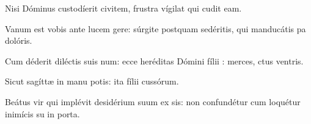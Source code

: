\item {}

\item Nisi Dóminus custodíerit civitem,\psstar{} frustra vígilat qui cudit eam.

\item Vanum est vobis ante lucem gere:\psstar{} súrgite postquam sedéritis, qui manducátis pa dolóris.

\item Cum déderit diléctis suis num:\psstar{} ecce heréditas Dómini fílii : merces, ctus ventris.

\item Sicut sagíttæ in manu potis:\psstar{} ita fílii cussórum.

\item Beátus vir qui implévit desidérium suum ex sis:\psstar{} non confundétur cum loquétur inimícis su in porta.

